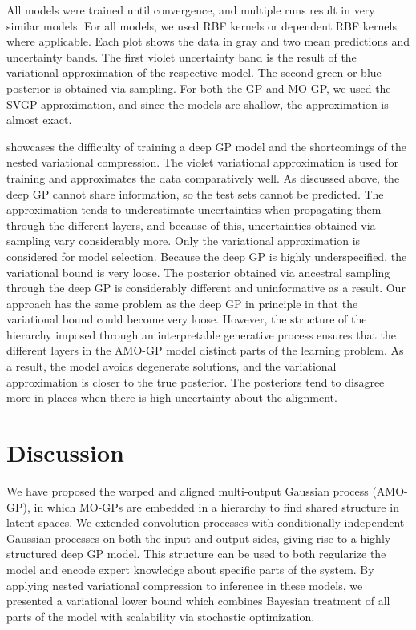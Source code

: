 All models were trained until convergence, and multiple runs result in very similar models.
For all models, we used RBF kernels or dependent RBF kernels where applicable.
Each plot shows the data in gray and two mean predictions and uncertainty bands.
The first violet uncertainty band is the result of the variational approximation of the respective model.
The second green or blue posterior is obtained via sampling.
For both the GP and MO-GP, we used the SVGP approximation, and since the models are shallow, the approximation is almost exact.

 showcases the difficulty of training a deep GP model and the shortcomings of the nested variational compression.
The violet variational approximation is used for training and approximates the data comparatively well.
As discussed above, the deep GP cannot share information, so the test sets cannot be predicted.
The approximation tends to underestimate uncertainties when propagating them through the different layers, and because of this, uncertainties obtained via sampling vary considerably more.
Only the variational approximation is considered for model selection.
Because the deep GP is highly underspecified, the variational bound is very loose.
The posterior obtained via ancestral sampling through the deep GP is considerably different and uninformative as a result.
Our approach has the same problem as the deep GP in principle in that the variational bound could become very loose.
However, the structure of the hierarchy imposed through an interpretable generative process ensures that the different layers in the AMO-GP model distinct parts of the learning problem.
As a result, the model avoids degenerate solutions, and the variational approximation is closer to the true posterior.
The posteriors tend to disagree more in places when there is high uncertainty about the alignment.


\section{Discussion}
We have proposed the warped and aligned multi-output Gaussian process (AMO-GP), in which MO-GPs are embedded in a hierarchy to find shared structure in latent spaces.
We extended convolution processes \parencite{boyle_dependent_2004} with conditionally independent Gaussian processes on both the input and output sides, giving rise to a highly structured deep GP model.
This structure can be used to both regularize the model and encode expert knowledge about specific parts of the system.
By applying nested variational compression \parencite{hensman_nested_2014} to inference in these models, we presented a variational lower bound which combines Bayesian treatment of all parts of the model with scalability via stochastic optimization.

